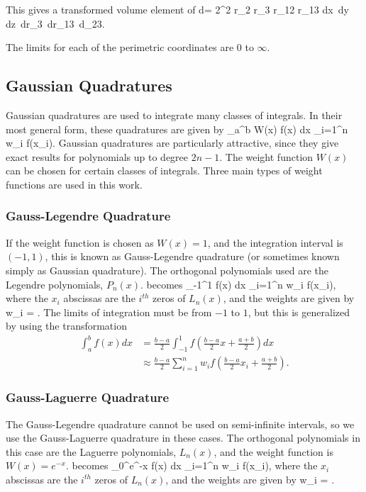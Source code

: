 \documentclass[Dissertation.tex]{subfiles}
\begin{document}
\noindent This gives a transformed volume element of
\beq
\label{eq:PerimetricVolEl}
d\tau = 2\pi^2 r_2 r_3 r_{12} r_{13} dx\, dy\, dz\, dr_3\, dr_{13}\, d\phi_{23}.
\eeq

\noindent The limits for each of the perimetric coordinates are 0 to $\infty$.


\subsection{Gaussian Quadratures}
\label{sec:GaussQuad}
Gaussian quadratures are used to integrate many classes of integrals. In their most general form, these quadratures are given by \cite[p.887]{Abramowitz1965}
\beq
\label{eq:GeneralQuadratures}
\int_a^b W(x) f(x) dx \approx \sum_{i=1}^n w_i f(x_i).
\eeq
Gaussian quadratures are particularly attractive, since they give exact results for polynomials up to degree $2n-1$. The weight function $W(x)$ can be chosen for certain classes of integrals. Three main types of weight functions are used in this work.


\subsubsection{Gauss-Legendre Quadrature}
\label{sec:GaussLegendre}
If the weight function is chosen as $W(x)=1$, and the integration interval is $(-1,1)$, this is known as Gauss-Legendre quadrature (or sometimes known simply as Gaussian quadrature). The orthogonal polynomials used are the Legendre polynomials, $P_n(x)$.  becomes
\beq
\label{eq:GaussLeg}
\int_{-1}^1 f(x) dx \approx \sum_{i=1}^n w_i f(x_i),
\eeq
where the $x_i$ abscissas are the $i^{th}$ zeros of $L_n(x)$, and the weights are given by
\beq
\label{eq:GaussLegWeights}
w_i = .
\eeq
The limits of integration must be from $-1$ to $1$, but this is generalized by using the transformation \cite{Abramowitz1965}
\begin{align}
\label{eq:GaussLegGen}
\int_a^b f(x) dx &= \frac{b-a}{2} \int_{-1}^1 f \left(\frac{b-a}{2} x + \frac{a+b}{2}\right) dx \\
&\approx \frac{b-a}{2} \sum_{i=1}^n w_i f \left(\frac{b-a}{2} x_i + \frac{a+b}{2}\right).
\end{align}


\subsubsection{Gauss-Laguerre Quadrature}
\label{sec:GaussLag}
The Gauss-Legendre quadrature cannot be used on semi-infinite intervals, so we use the Gauss-Laguerre quadrature in these cases. The orthogonal polynomials in this case are the Laguerre polynomials, $L_n(x)$, and the weight function is $W(x) = e^{-x}$.  becomes
\beq
\label{eq:GaussLag}
\int_0^\infty e^{-x} f(x) dx \approx \sum_{i=1}^n w_i f(x_i),
\eeq
where the $x_i$ abscissas are the $i^{th}$ zeros of $L_n(x)$, and the weights are given by
\beq
\label{eq:GaussLagWeights}
w_i = .
\eeq
\end{document}
